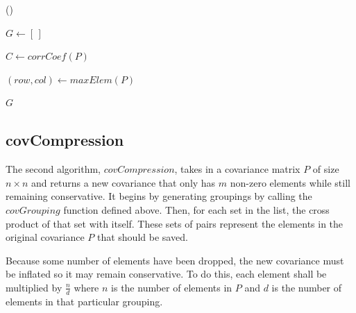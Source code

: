 \documentclass[11pt]{article}
\begin{document}
\begin{algorithm}


\Begin() {
	$G\leftarrow\left[\,\right]$
	
	\BlankLine
	$C\leftarrow corrCoef(P)$
	
	\BlankLine
	$\left(row, col\right)\leftarrow maxElem(P)$
	
	
	
	\Return $G$
}
	
\end{algorithm}

\subsection{covCompression}
The second algorithm, $covCompression$, takes in a covariance matrix $P$ of size $n \times n$ and returns a new covariance that only has $m$ non-zero elements while still remaining conservative. 
It begins by generating groupings by calling the $covGrouping$ function defined above. 
Then, for each set in the list, the cross product of that set with itself. 
These sets of pairs represent the elements in the original covariance $P$ that should be saved. 

Because some number of elements have been dropped, the new covariance must be inflated so it may remain conservative. 
To do this, each element shall be multiplied by $\frac{n}{d}$ where $n$ is the number of elements in $P$ and $d$ is the number of elements in that particular grouping.  
\end{document}
